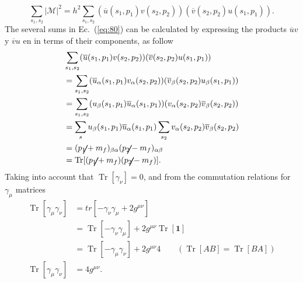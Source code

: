 \begin{equation}
\sum_{s_1,s_2}|\mathcal{M}|^{2}=h^2\sum_{s_1,s_2}(\overline{u}(s_1,p_{1})v(s_2,
p_{2}))(\overline{v}(s_2,p_{2})u(s_1,p_{1})). \label{eq:80}
\end{equation}
The several sums in Ec.~(\ref{eq:80}) can be calculated by expressing the products  $\overline{u}v$ y $\overline{v}u$ en in terms of their components, as follow
\begin{align}
\label{eq:81}
&\sum_{s_1,s_2}(\overline{u}(s_1,p_{1})v(s_2, p_{2}))(\overline{v}(s_2,p_{2})u(s_1,p_{1}))\nonumber\\
&=\sum_{s_1,s_2}(\overline{u}_{\alpha}(s_1,p_{1})v_{\alpha}(s_2, p_{2}))(\overline{v}_{\beta}(s_2,p_{2})u_{\beta}(s_1,p_{1}))\nonumber\\
&=\sum_{s_1,s_2}(u_{\beta}(s_1,p_{1})\overline{u}_{\alpha}(s_1,p_{1}))(v_{\alpha}(s_2, p_{2})\overline{v}_{\beta}(s_2,p_{2}))\nonumber\\
&=\sum_{s}u_{\beta}(s_1,p_{1})\overline{u}_{\alpha}(s_1,p_{1})\sum_{s_2}v_{\alpha}(s_2, p_{2})\overline{v}_{\beta}(s_2,p_{2})\nonumber\\
&=(\cancel{p}_{1}+m_{f})_{\beta\alpha}(\cancel{p}_{2}-m_{f})_{\alpha\beta}\nonumber\\
&=\operatorname{Tr}[(\cancel{p}_{1}+m_{f})(\cancel{p}_{2}-m_{f})]. 
\end{align}
Taking into account that  $\operatorname{Tr}[\gamma_{\nu}]=0$, and from the commutation relations for $\gamma_\mu$ matrices
\begin{align*}
\operatorname{Tr}[\gamma_{\mu}\gamma_{\nu}]&=tr[-\gamma_{\nu}\gamma_{\mu}+2g^{\mu\nu}]\\
&=\operatorname{Tr}[-\gamma_{\nu}\gamma_{\mu}]+2g^{\mu\nu}\operatorname{Tr}[\mathbf{1}]\\
&=\operatorname{Tr}[-\gamma_{\mu}\gamma_{\nu}]+2g^{\mu\nu}4 \qquad (\operatorname{Tr}[AB]=\operatorname{Tr}[BA])\\
\operatorname{Tr}[\gamma_{\mu}\gamma_{\nu}]&=4g^{\mu\nu}.
\end{align*}

